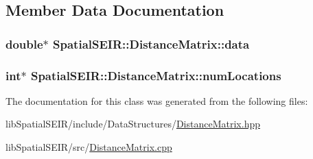 \subsection{Member Data Documentation}
\hypertarget{classSpatialSEIR_1_1DistanceMatrix_a9d55c558325f820a6b581c096464b4ac}{
\subsubsection[{data}]{\setlength{\rightskip}{0pt plus 5cm}double$\ast$ Spatial\-S\-E\-I\-R\-::\-Distance\-Matrix\-::data}}\label{classSpatialSEIR_1_1DistanceMatrix_a9d55c558325f820a6b581c096464b4ac}
\hypertarget{classSpatialSEIR_1_1DistanceMatrix_ad4efa9884c0b6fa2bd8dcc61ed17263f}{
\subsubsection[{num\-Locations}]{\setlength{\rightskip}{0pt plus 5cm}int$\ast$ Spatial\-S\-E\-I\-R\-::\-Distance\-Matrix\-::num\-Locations}}\label{classSpatialSEIR_1_1DistanceMatrix_ad4efa9884c0b6fa2bd8dcc61ed17263f}


The documentation for this class was generated from the following files\-:\begin{DoxyCompactItemize}
\item 
lib\-Spatial\-S\-E\-I\-R/include/\-Data\-Structures/\hyperlink{DistanceMatrix_8hpp}{Distance\-Matrix.\-hpp}\item 
lib\-Spatial\-S\-E\-I\-R/src/\hyperlink{DistanceMatrix_8cpp}{Distance\-Matrix.\-cpp}\end{DoxyCompactItemize}
